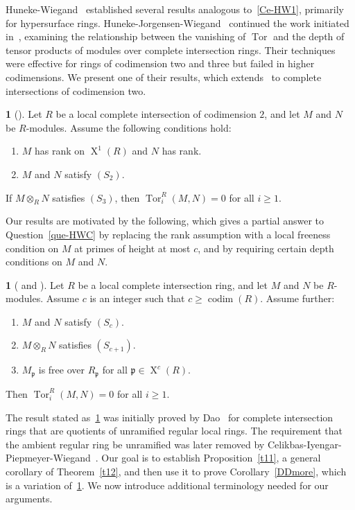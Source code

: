 \documentclass[11pt]{amsart}
\theoremstyle{definition}
\theoremstyle{definition}
\newtheorem{chunk}[thm]{\hspace*{-1.065ex}\bf}
\numberwithin{equation}{section}
\newcommand{\fp}{\mathfrak{p}}
\DeclareMathOperator{\X}{X}
\DeclareMathOperator{\Tor}{Tor}
\DeclareMathOperator{\cod}{codim}
\begin{document}
Huneke-Wiegand~\cite{HW2} established several results analogous to~\ref{Ce-HW1}, primarily for hypersurface rings. Huneke-Jorgensen-Wiegand~\cite{HJW} continued the work initiated in~\cite{HW1, HW2}, examining the relationship between the vanishing of $\Tor$ and the depth of tensor products of modules over complete intersection rings. Their techniques were effective for rings of codimension two and three but failed in higher codimensions. We present one of their results, which extends~\cite[2.7]{HW1} to complete intersections of codimension two.

\begin{chunk}[{\cite[2.4]{HJW}}] Let $R$ be a local complete intersection of codimension $2$, and let $M$ and $N$ be $R$-modules. Assume the following conditions hold:
\begin{enumerate}[\rm(i)]
\item $M$ has rank on $\X^1(R)$ and $N$ has rank.
\item $M$ and $N$ satisfy $(S_{2})$.
\end{enumerate}
If $M\otimes_RN$ satisfies $(S_{3})$, then $\Tor^{R}_{i}(M,N) = 0$ for all $i \geq 1$.
\end{chunk}

Our results are motivated by the following, which gives a partial answer to Question~\ref{que-HWC} by replacing the rank assumption with a local freeness condition on $M$ at primes of height at most $c$, and by requiring certain depth conditions on $M$ and $N$.

\begin{chunk} [{\cite[7.7]{Da2} and \cite[3.14]{CIPW}}] \label{DD} Let $R$ be a local complete intersection ring, and let $M$ and $N$ be $R$-modules. Assume $c$ is an integer such that $c \geq \cod(R)$. Assume further:
\begin{enumerate}[\rm(i)]
\item $M$ and $N$ satisfy $(S_{c})$.
\item $M\otimes_RN$ satisfies $(S_{c+1})$.
\item $M_{\fp}$ is free over $R_{\fp}$ for all $\fp \in \X^{c}(R)$. 
\end{enumerate}
Then $\Tor_{i}^R(M,N)=0$ for all $i\geq 1$.
\end{chunk}

The result stated as~\ref{DD} was initially proved by Dao~\cite{Da2} for complete intersection rings that are quotients of unramified regular local rings. The requirement that the ambient regular ring be unramified was later removed by Celikbas-Iyengar-Piepmeyer-Wiegand~\cite{CIPW}. Our goal is to establish Proposition~\ref{t11}, a general corollary of Theorem~\ref{t12}, and then use it to prove Corollary~\ref{DDmore}, which is a variation of~\ref{DD}. We now introduce additional terminology needed for our arguments.
\end{document}
